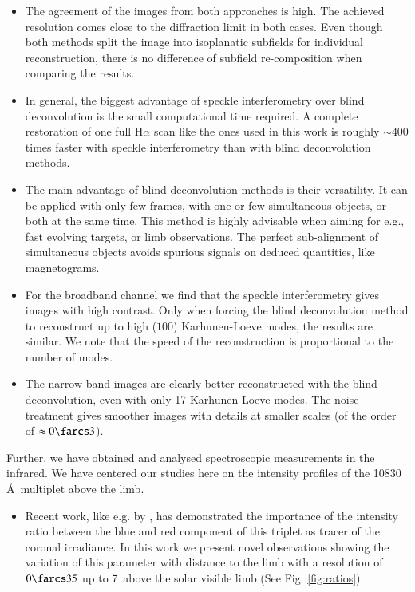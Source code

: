\begin{itemize}
\item The agreement of the images from both approaches is high. The achieved resolution comes close to the diffraction limit in both cases. Even though both methods split the image into isoplanatic subfields for individual reconstruction, there is no difference of subfield re-composition when comparing the results.
\item In general, the biggest advantage of speckle interferometry over blind deconvolution is the small computational time required. A complete restoration of one full H$\alpha$ scan like the ones used in this work is roughly $\sim400$ times faster with speckle interferometry than with blind deconvolution methods.
\item The main advantage of blind deconvolution methods is their versatility. It can be applied with only few frames, with one or few simultaneous objects, or both at the same time. This method is highly advisable when aiming for e.g., fast evolving targets, or limb observations. The perfect sub-alignment of simultaneous objects avoids spurious signals on deduced quantities, like magnetograms.
\item For the broadband channel we find that the speckle interferometry gives images with high contrast. Only when forcing the blind deconvolution method to reconstruct up to high  ($100$) Karhunen-Loeve modes, the results are similar. We note that the speed of the reconstruction is proportional to the number of modes.
\item The narrow-band images are clearly better reconstructed with the blind deconvolution, even with only 17  Karhunen-Loeve modes. The noise treatment gives smoother images with details at smaller scales (of the order of $\approx 0\farcs3$).
\end{itemize}
Further, we have obtained and analysed spectroscopic measurements in the infrared. We have centered our studies here on the intensity profiles of the  10830 \AA\, multiplet above the limb.
\begin{itemize}
\item Recent work, like e.g. by \citet{truj05, Centeno06}, has demonstrated the importance of the intensity ratio between the blue and red component of this triplet as tracer of the coronal irradiance. In this work we present novel observations showing the variation of this parameter with distance to the limb with a resolution of $0\farcs35$ up to 7\arcsec\, above the solar visible limb (See Fig. \ref{fig:ratios}).
\end{itemize}

